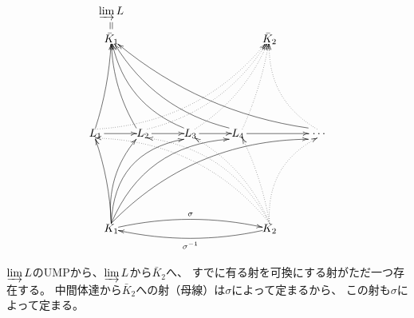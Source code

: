 \documentclass[a4j]{jarticle}
\begin{document}
    \[
    \begin{xy}
        (00, 30)    *{L_1}="L1",
        (15, 30)    *{L_2}="L2",
        (30, 30)    *{L_3}="L3",
        (45, 30)    *{L_4}="L4",
        (70, 30)    *{~\dots}="Li",
        (5, 60)     *{\bar{K}_1}="cK1",
        (5, 00)     *{K_1}="K1",
        (55, 60)    *{\bar{K}_2}="cK2",
        (55, 00)    *{K_2}="K2",
        (5, 68)     *{\varinjlim L}="lim",

        \ar@{->}            "L1"+<0.8em,0em>;"L2"
        \ar@{->}            "L2"+<0.8em,0em>;"L3"
        \ar@{->}            "L3"+<0.8em,0em>;"L4"
        \ar@{->}            "L4"+<0.8em,0em>;"Li"

        \ar@{->}@/_1mm/ "K1"+<0.0em,0.5em>;"L1"+<-0.0em,-0.5em>
        \ar@{->}@/^3mm/ "K1"+<0.0em,0.5em>;"L2"+<-0.6em,-0.5em>
        \ar@{->}@/^7mm/ "K1"+<0.0em,0.5em>;"L3"+<-0.6em,-0.5em>
        \ar@{->}@/^7mm/ "K1"+<0.0em,0.5em>;"L4"+<-0.8em,-0.5em>
        \ar@{->}@/^7mm/ "K1"+<0.0em,0.5em>;"Li"+<-0.8em,-0.5em>
        \ar@{->}@/_1mm/ "L1"+<-0.0em,0.5em>;"cK1"
        \ar@{->}@/^2mm/ "L2"+<-0.6em,0.5em>;"cK1"
        \ar@{->}@/^5mm/ "L3"+<-0.6em,0.5em>;"cK1"
        \ar@{->}@/^5mm/ "L4"+<-0.8em,0.5em>;"cK1"
        \ar@{->}@/^5mm/ "Li"+<-0.8em,0.5em>;"cK1"

        \ar@{.>}@/_7mm/ "K2"+<0.0em,0.5em>;"L1"+<0.0em,-0.4em>
        \ar@{.>}@/_6mm/ "K2"+<0.0em,0.5em>;"L2"+<0.4em,-0.4em>
        \ar@{.>}@/_3mm/ "K2"+<0.0em,0.5em>;"L3"+<0.4em,-0.4em>
        \ar@{.>}@/_1mm/ "K2"+<0.0em,0.5em>;"L4"+<0.4em,-0.4em>
        \ar@{.>}@/^5mm/ "K2"+<0.0em,0.5em>;"Li"+<0.0em,-0.4em>
        \ar@{.>}@/_7mm/ "L1"+<0.0em,0.4em>;"cK2"
        \ar@{.>}@/_5mm/ "L2"+<0.4em,0.4em>;"cK2"
        \ar@{.>}@/_3mm/ "L3"+<0.4em,0.4em>;"cK2"
        \ar@{.>}@/_1mm/ "L4"+<0.4em,0.4em>;"cK2"
        \ar@{.>}@/^5mm/ "Li"+<0.0em,0.4em>;"cK2"

        \ar@{->}@/^3mm/^{\sigma} "K1";"K2"
        \ar@{->}@/^3mm/^{\sigma^{-1}} "K2";"K1"

        \ar@{=} "cK1"+<0mm,3mm>;"lim"+<0mm,-3mm>
    \end{xy}
    \]

    $\varinjlim L$のUMPから、$\varinjlim L$から$\bar{K}_2$へ、
    すでに有る射を可換にする射がただ一つ存在する。
    中間体達から$\bar{K}_2$への射（母線）は$\sigma$によって定まるから、
    この射も$\sigma$によって定まる。
\end{document}
